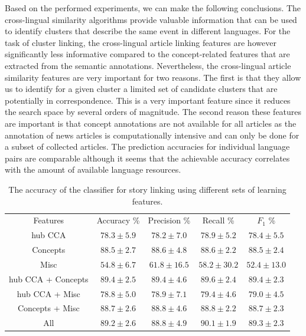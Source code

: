 Based on the performed experiments, we can make the following conclusions.
The cross-lingual similarity algorithms provide valuable information that can be
used to identify clusters that describe the same event in different languages.
For the task of cluster linking, the cross-lingual article linking features
are however significantly less informative compared to the concept-related
features that are extracted from the semantic annotations. Nevertheless, the
cross-lingual article similarity features are very important for two reasons.
The first is that they allow us to identify for a given cluster a
limited set of candidate clusters that are potentially in correspondence.
This is a very important feature since it reduces the search space by several
orders of magnitude. The second reason these features are important is
that concept annotations are not available for all articles as the
annotation of news articles is computationally intensive and can only
be done for a subset of collected articles. The prediction accuracies
for individual language pairs are comparable although it seems that
the achievable accuracy correlates with the amount of available language resources.


\begin{table}[t]
\caption[Story linking accuracy for several feature sets]{The accuracy of the classifier for story linking using different sets of learning features.}
\begin{center}
\begin{tabular}{|c|c|c|c|c|}
  \hline
  \cline{1-5}
  Features & Accuracy \% & Precision \% & Recall \% & $F_1$ \%  \\ \cline{1-5}
  hub CCA            & $78.3 \pm 5.9$ & $78.2 \pm  7.0$ & $78.9 \pm  5.2$ & $78.4 \pm  5.5$ \\ \cline{1-5}
  Concepts           & $88.5 \pm 2.7$ & $88.6 \pm  4.8$ & $88.6 \pm  2.2$ & $88.5 \pm  2.4$ \\ \cline{1-5}
  Misc               & $54.8 \pm 6.7$ & $61.8 \pm 16.5$ & $58.2 \pm 30.2$ & $52.4 \pm 13.0$ \\ \cline{1-5}
  hub CCA + Concepts & $89.4 \pm 2.5$ & $89.4 \pm  4.6$ & $89.6 \pm  2.4$ & $89.4 \pm  2.3$ \\ \cline{1-5}
  hub CCA + Misc     & $78.8 \pm 5.0$ & $78.9 \pm  7.1$ & $79.4 \pm  4.6$ & $79.0 \pm  4.5$ \\ \cline{1-5}
  Concepts + Misc    & $88.7 \pm 2.6$ & $88.8 \pm  4.6$ & $88.8 \pm  2.2$ & $88.7 \pm  2.3$ \\ \cline{1-5}
  All                & $89.2 \pm 2.6$ & $88.8 \pm  4.9$ & $90.1 \pm  1.9$ & $89.3 \pm  2.3$ \\ \cline{1-5}
  \hline
\end{tabular}
\end{center}
\label{table:linkingEval}
\end{table}

